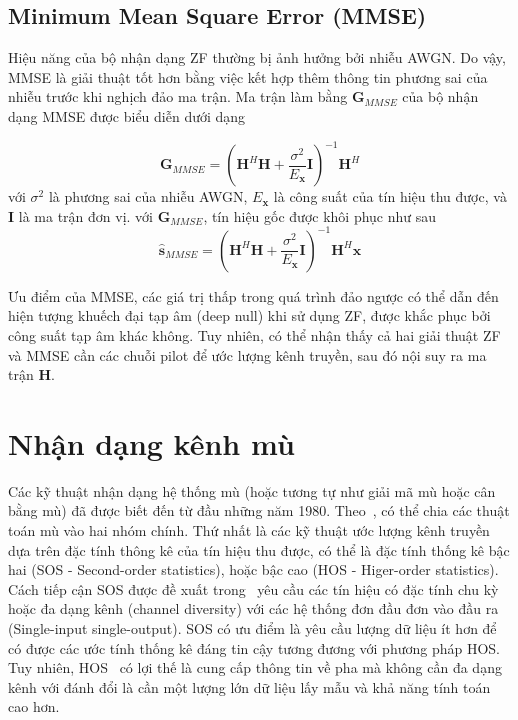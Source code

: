 \subsection{Minimum Mean Square Error (MMSE)} \label{sec:mmse}

Hiệu năng của bộ nhận dạng ZF thường bị ảnh hưởng bởi nhiễu AWGN. Do vậy, MMSE là giải thuật tốt hơn bằng việc kết hợp thêm thông tin phương sai của nhiễu trước khi nghịch đảo ma trận. Ma trận làm bằng $\mathbf{G}_{MMSE}$ của bộ nhận dạng MMSE được biểu diễn dưới dạng

\begin{equation}
    \mathbf{G}_{MMSE}=\left(\mathbf{H}^H \mathbf{H}+\frac{\sigma^2}{E_\mathbf{x}} \mathbf{I}\right)^{-1} \mathbf{H}^H
\end{equation}
với $\sigma^2$ là phương sai của nhiễu AWGN, $E_\mathbf{x}$ là công suất của tín hiệu thu được, và $\mathbf{I}$ là ma trận đơn vị. với $\mathbf{G}_{MMSE}$, tín hiệu gốc được khôi phục như sau
\begin{equation}
    \hat{\mathbf{s}}_{MMSE}=\left(\mathbf{H}^H \mathbf{H}+\frac{\sigma^2}{E_\mathbf{x}} \mathbf{I}\right)^{-1} \mathbf{H}^H \mathbf{x}
\end{equation}

Ưu điểm của MMSE, các giá trị thấp trong quá trình đảo ngược có thể dẫn đến hiện tượng khuếch đại tạp âm (deep null) khi sử dụng ZF, được khắc phục bởi công suất tạp âm khác không. Tuy nhiên, có thể nhận thấy cả hai giải thuật ZF và MMSE cần các chuỗi pilot để ước lượng kênh truyền, sau đó nội suy ra ma trận $\mathbf{H}$.

\section{Nhận dạng kênh mù} \label{sec:blind}

Các kỹ thuật nhận dạng hệ thống mù (hoặc tương tự như giải mã mù hoặc cân bằng mù) đã được biết đến từ đầu những năm 1980. Theo~\cite{vilas2022}, có thể chia các thuật toán mù vào hai nhóm chính. Thứ nhất là các kỹ thuật ước lượng kênh truyền dựa trên đặc tính thông kê của tín hiệu thu được, có thể là đặc tính thống kê bậc hai (SOS - Second-order statistics), hoặc bậc cao (HOS - Higer-order statistics). Cách tiếp cận SOS được đề xuất trong~\cite{Tong1994} yêu cầu các tín hiệu có đặc tính chu kỳ hoặc đa dạng kênh (channel diversity) với các hệ thống đơn đầu đơn vào đầu ra (Single-input single-output). SOS có ưu điểm là yêu cầu lượng dữ liệu ít hơn để có được các ước tính thống kê đáng tin cậy tương đương với phương pháp HOS. Tuy nhiên, HOS~\cite{Giannakis1997} có lợi thế là cung cấp thông tin về pha mà không cần đa dạng kênh với đánh đổi là cần một lượng lớn dữ liệu lấy mẫu và khả năng tính toán cao hơn.

